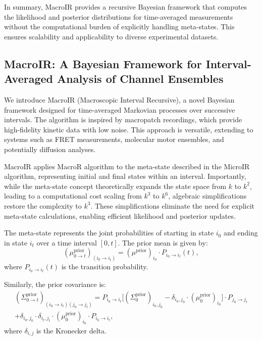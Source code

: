 \documentclass[pdflatex,sn-mathphys-num]{sn-jnl}%
\theoremstyle{thmstyleone}%
\theoremstyle{thmstyletwo}%
\theoremstyle{thmstylethree}%
\begin{document}
In summary, MacroIR provides a recursive Bayesian framework that computes the likelihood and posterior distributions for time-averaged measurements without the computational burden of explicitly handling meta-states. This ensures scalability and applicability to diverse experimental datasets.




\subsection{MacroIR: A Bayesian Framework for Interval-Averaged Analysis of Channel Ensembles}

We introduce MacroIR (Macroscopic Interval Recursive), a novel Bayesian framework designed for time-averaged Markovian processes over successive intervals. The algorithm is inspired by macropatch recordings, which provide high-fidelity kinetic data with low noise. This approach is versatile, extending to systems such as FRET measurements, molecular motor ensembles, and potentially diffusion analyses.

MacroIR applies MacroR algorithm to the meta-state described in the MicroIR algorithm, representing initial and final states within an interval. Importantly, while the meta-state concept theoretically expands the state space from \( k \) to \( k^2 \), leading to a computational cost scaling from \( k^3 \) to \( k^6 \), algebraic simplifications restore the complexity to \( k^3 \). These simplifications eliminate the need for explicit meta-state calculations, enabling efficient likelihood and posterior updates.

The meta-state represents the joint probabilities of starting in state \( i_0 \) and ending in state \( i_t \) over a time interval \( [0, t] \). The prior mean is given by:
\begin{equation}
	(\mu^{\text{prior}}_{0 \rightarrow t})_{(i_0 \rightarrow i_t)} = (\mu^{\text{prior}})_{i_0} \cdot P_{i_0 \rightarrow i_t}(t),
	\label{eq:meta_mean_prior}
\end{equation}
where \( P_{i_0 \rightarrow i_t}(t) \) is the transition probability.

Similarly, the prior covariance is:
\begin{multline}
	(\Sigma^{\text{prior}}_{0 \rightarrow t})_{(i_0 \rightarrow i_t)(j_0 \rightarrow j_t)} = 
	P_{i_0 \rightarrow i_t} \big[(\Sigma^{\text{prior}}_0)_{i_0, j_0} - \delta_{i_0, j_0} \cdot (\mu^{\text{prior}}_0)_{i_0} \big] \cdot P_{j_0 \rightarrow j_t} \\
	+ \delta_{i_0, j_0} \cdot \delta_{i_t, j_t} \cdot (\mu^{\text{prior}}_0)_{i_0} \cdot P_{i_0 \rightarrow i_t},
	\label{eq:meta_covariance_prior}
\end{multline}
where \( \delta_{i, j} \) is the Kronecker delta.
\end{document}
